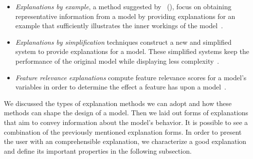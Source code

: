 \begin{itemize}
    \item \emph{Explanations by example}, a method suggested by~\citeauthor{CaseBasedExplanation_Caruana} (\citeyear{CaseBasedExplanation_Caruana}), focus on obtaining representative information from a model by providing explanations for an example that sufficiently illustrates the inner workings of the model~\parencite{HowToExplainIndividualClassificationDecisions_Baehrens, XAIConceptsTaxonomies_Arrieta}.
    \item \emph{Explanations by simplification} techniques construct a new and simplified system to provide explanations for a model. These simplified systems keep the performance of the original model while displaying less complexity~\parencite{XAIConceptsTaxonomies_Arrieta}.
    \item \emph{Feature relevance explanations} compute feature relevance scores for a model's variables in order to determine the effect a feature has upon a model~\parencite{XAIConceptsTaxonomies_Arrieta}.
\end{itemize}
We discussed the types of explanation methods we can adopt and how these methods can shape the design of a model. Then we laid out forms of explanations that aim to convey information about the model's behavior. It is possible to see a combination of the previously mentioned explanation forms. In order to present the user with an comprehensible explanation, we characterize a good explanation and define its important properties in the following subsection.


